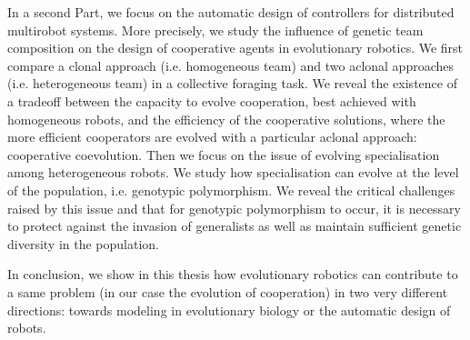 	In a second Part, we focus on the automatic design of controllers for distributed multirobot systems. More precisely, we study the influence of genetic team composition on the design of cooperative agents in evolutionary robotics. We first compare a clonal approach (i.e. homogeneous team) and two aclonal approaches (i.e. heterogeneous team) in a collective foraging task. We reveal the existence of a tradeoff between the capacity to evolve cooperation, best achieved with homogeneous robots, and the efficiency of the cooperative solutions, where the more efficient cooperators are evolved with a particular aclonal approach: cooperative coevolution. Then we focus on the issue of evolving specialisation among heterogeneous robots. We study how specialisation can evolve at the level of the population, i.e. genotypic polymorphism. We reveal the critical challenges raised by this issue and that for genotypic polymorphism to occur, it is necessary to protect against the invasion of generalists as well as maintain sufficient genetic diversity in the population.

	In conclusion, we show in this thesis how evolutionary robotics can contribute to a same problem (in our case the evolution of cooperation) in two very different directions: towards modeling in evolutionary biology or the automatic design of robots.